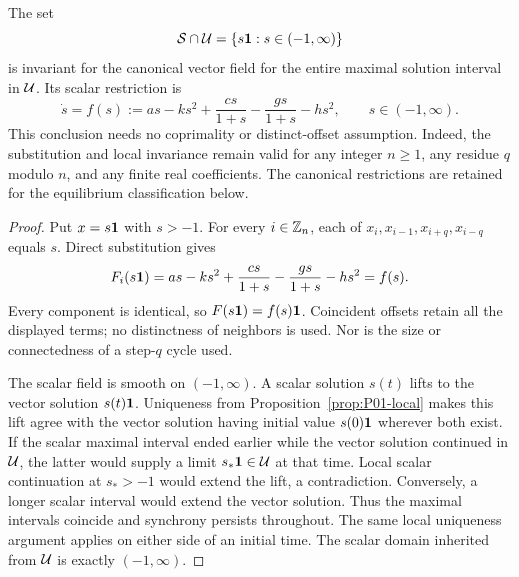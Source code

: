 \begin{proposition}
\label{prop:P02-invariance}
The set
\[
 \mathcal{S}\cap\mathcal{U}=\{s\mathbf{1}:s\in(-1,\infty)\}
\]
is invariant for the canonical vector field for the entire maximal
solution interval in $\mathcal{U}$. Its scalar restriction is
\begin{equation}
\label{eq:P02-scalar-original}
 \dot s=f(s):=as-ks^2+\frac{cs}{1+s}
                     -\frac{gs}{1+s}-hs^2,
 \qquad s\in(-1,\infty).
\end{equation}
This conclusion needs no coprimality or distinct-offset assumption.
Indeed, the substitution and local invariance remain valid for any
integer $n\ge1$, any residue $q$ modulo $n$, and any finite real
coefficients. The canonical restrictions are retained for the
equilibrium classification below.
\end{proposition}

\begin{proof}
Put $x=s\mathbf{1}$ with $s>-1$. For every $i\in\mathbb{Z}_n$, each of
$x_i,x_{i-1},x_{i+q},x_{i-q}$ equals $s$. Direct substitution gives
\[
 F_i(s\mathbf{1})=as-ks^2+\frac{cs}{1+s}
                        -\frac{gs}{1+s}-hs^2=f(s).
\]
Every component is identical, so $F(s\mathbf{1})=f(s)\mathbf{1}$.
Coincident offsets retain all the displayed terms; no distinctness
of neighbors is used. Nor is the size or connectedness of a
step-$q$ cycle used.

The scalar field is smooth on $(-1,\infty)$. A scalar solution
$s(t)$ lifts to the vector solution $s(t)\mathbf{1}$. Uniqueness from
Proposition~\ref{prop:P01-local} makes this lift agree with the
vector solution having initial value $s(0)\mathbf{1}$ wherever both exist.
If the scalar maximal interval ended earlier while the vector
solution continued in $\mathcal{U}$, the latter would supply a limit
$s_*\mathbf{1}\in\mathcal{U}$ at that time. Local scalar continuation at
$s_*>-1$ would extend the lift, a contradiction. Conversely, a longer
scalar interval would extend the vector solution. Thus the maximal
intervals coincide and synchrony persists throughout. The same local
uniqueness argument applies on either side of an initial time.
The scalar domain inherited from $\mathcal{U}$ is exactly $(-1,\infty)$.
\end{proof}

